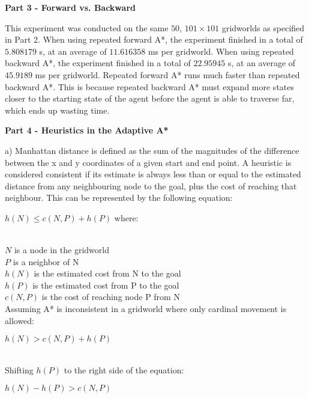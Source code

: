 \documentclass[11pt]{article}
\begin{document}
    \begin{center}
        \Large
        \textbf{Part 3 - Forward vs. Backward}
    \end{center}
    \normalsize
    This experiment was conducted on the same $50$, $101 \times 101$ gridworlds as specified in Part 2.
    When using repeated forward A*, the experiment finished in a total of $5.808179$ s, at an average of $11.616358$ ms per gridworld.
    When using repeated backward A*, the experiment finished in a total of $22.95945$ s, at an average of $45.9189$ ms per gridworld.
    \newline\newline
    Repeated forward A* runs much faster than repeated backward A*.
    This is because repeated backward A* must expand more states closer to the starting state of the agent before the agent is able to traverse far,
    which ends up wasting time.


    \begin{center}
        \Large
        \textbf{Part 4 - Heuristics in the Adaptive A*}
    \end{center}
    \normalsize
    a) Manhattan distance is defined as the sum of the magnitudes of the difference between the x and y coordinates of a given start and end point. A heuristic is considered consistent if its estimate is always less than or equal to the estimated distance from any neighbouring node to the goal, plus the cost of reaching that neighbour. This can be represented by the following equation:\\
    \centerline{$h(N) \le c(N, P) + h(P)$ where:} \\
    $N$ is a node in the gridworld \\
    $P$ is a neighbor of N\\
    $h(N)$ is the estimated cost from N to the goal\\
    $h(P)$ is the estimated cost from P to the goal\\
    $c(N,P)$ is the cost of reaching node P from N\\
    
    Assuming A* is inconsistent in a gridworld where only cardinal movement is allowed:\\
    \centerline{$h(N) > c(N, P) + h(P)$}\\
    
    Shifting $h(P)$ to the right side of the equation:\\
    \centerline{$h(N) - h(P) > c(N, P)$}\\
    
\end{document}
